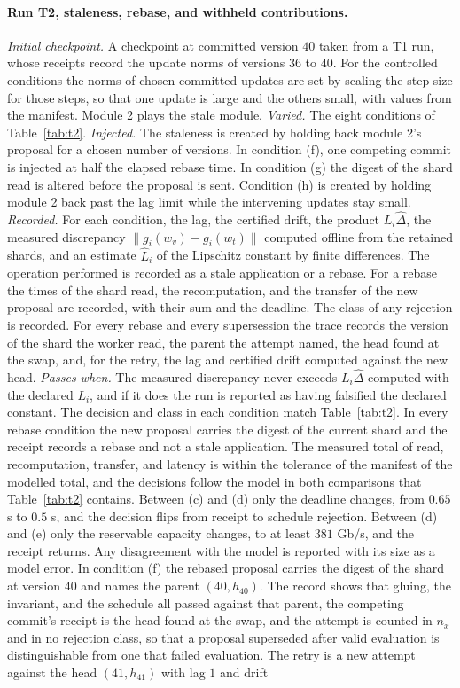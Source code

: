 \documentclass[11pt,openany]{book}
\theoremstyle{remark}
\begin{document}
\paragraph{Run T2, staleness, rebase, and withheld contributions.} \emph{Initial checkpoint.} A checkpoint at committed version $40$ taken from a T1 run, whose receipts record the update norms of versions $36$ to $40$. For the controlled conditions the norms of chosen committed updates are set by scaling the step size for those steps, so that one update is large and the others small, with values from the manifest. Module 2 plays the stale module. \emph{Varied.} The eight conditions of Table~\ref{tab:t2}. \emph{Injected.} The staleness is created by holding back module 2's proposal for a chosen number of versions. In condition (f), one competing commit is injected at half the elapsed rebase time. In condition (g) the digest of the shard read is altered before the proposal is sent. Condition (h) is created by holding module 2 back past the lag limit while the intervening updates stay small. \emph{Recorded.} For each condition, the lag, the certified drift, the product $L_i\hat\Delta$, the measured discrepancy $\lVert g_i(w_v)-g_i(w_t)\rVert$ computed offline from the retained shards, and an estimate $\hat L_i$ of the Lipschitz constant by finite differences. The operation performed is recorded as a stale application or a rebase. For a rebase the times of the shard read, the recomputation, and the transfer of the new proposal are recorded, with their sum and the deadline. The class of any rejection is recorded. For every rebase and every supersession the trace records the version of the shard the worker read, the parent the attempt named, the head found at the swap, and, for the retry, the lag and certified drift computed against the new head. \emph{Passes when.} The measured discrepancy never exceeds $L_i\hat\Delta$ computed with the declared $L_i$, and if it does the run is reported as having falsified the declared constant. The decision and class in each condition match Table~\ref{tab:t2}. In every rebase condition the new proposal carries the digest of the current shard and the receipt records a rebase and not a stale application. The measured total of read, recomputation, transfer, and latency is within the tolerance of the manifest of the modelled total, and the decisions follow the model in both comparisons that Table~\ref{tab:t2} contains. Between (c) and (d) only the deadline changes, from $0.65$ s to $0.5$ s, and the decision flips from receipt to schedule rejection. Between (d) and (e) only the reservable capacity changes, to at least $381$ Gb/s, and the receipt returns. Any disagreement with the model is reported with its size as a model error. In condition (f) the rebased proposal carries the digest of the shard at version $40$ and names the parent $(40,h_{40})$. The record shows that gluing, the invariant, and the schedule all passed against that parent, the competing commit's receipt is the head found at the swap, and the attempt is counted in $n_x$ and in no rejection class, so that a proposal superseded after valid evaluation is distinguishable from one that failed evaluation. The retry is a new attempt against the head $(41,h_{41})$ with lag $1$ and drift 
\end{document}
